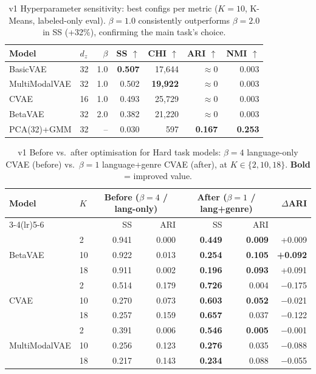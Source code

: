 \documentclass{article}
\begin{document}
\begin{table}[H]
\centering
\caption{v1 Hyperparameter sensitivity: best configs per metric ($K\!=\!10$, K-Means,
labeled-only eval). $\beta\!=\!1.0$ consistently outperforms $\beta\!=\!2.0$ in SS (+32\%),
confirming the main task's choice.}
\label{tab:finetune}
\small
\begin{tabular}{llrrrrr}
\toprule
\textbf{Model} & \textbf{$d_z$} & \textbf{$\beta$} & \textbf{SS $\uparrow$} &
\textbf{CHI $\uparrow$} & \textbf{ARI $\uparrow$} & \textbf{NMI $\uparrow$} \\
\midrule
BasicVAE      & 32 & 1.0 & \textbf{0.507} & 17,644 & $\approx$0 & 0.003 \\
MultiModalVAE & 32 & 1.0 & 0.502 & \textbf{19,922} & $\approx$0 & 0.003 \\
CVAE          & 16 & 1.0 & 0.493 & 25,729 & $\approx$0 & 0.003 \\
BetaVAE       & 32 & 2.0 & 0.382 & 21,220 & $\approx$0 & 0.003 \\
\rowcolor{gray!15} PCA(32)+GMM & 32 & -- & 0.030 & 597 & \textbf{0.167} & \textbf{0.253} \\
\bottomrule
\end{tabular}
\end{table}

\begin{table}[H]
\centering
\caption{v1 Before vs.\ after optimisation for Hard task models: $\beta\!=\!4$ language-only
CVAE (before) vs.\ $\beta\!=\!1$ language+genre CVAE (after), at $K\!\in\!\{2,10,18\}$.
\textbf{Bold} = improved value.}
\label{tab:before_after}
\small
\begin{tabular}{llrrrrr}
\toprule
\textbf{Model} & \textbf{$K$} & \multicolumn{2}{c}{\textbf{Before ($\beta\!=\!4$ / lang-only)}} &
\multicolumn{2}{c}{\textbf{After ($\beta\!=\!1$ / lang+genre)}} & \textbf{$\Delta$ARI} \\
\cmidrule(lr){3-4}\cmidrule(lr){5-6}
 & & SS & ARI & SS & ARI & \\
\midrule
\multirow{3}{*}{BetaVAE}
 & 2  & 0.941 & 0.000 & \textbf{0.449} & \textbf{0.009} & +0.009 \\
 & 10 & 0.922 & 0.013 & \textbf{0.254} & \textbf{0.105} & \textbf{+0.092} \\
 & 18 & 0.911 & 0.002 & \textbf{0.196} & \textbf{0.093} & +0.091 \\
\midrule
\multirow{3}{*}{CVAE}
 & 2  & 0.514 & 0.179 & \textbf{0.726} & 0.004 & $-$0.175 \\
 & 10 & 0.270 & 0.073 & \textbf{0.603} & \textbf{0.052} & $-$0.021 \\
 & 18 & 0.257 & 0.159 & \textbf{0.657} & 0.037 & $-$0.122 \\
\midrule
\multirow{3}{*}{MultiModalVAE}
 & 2  & 0.391 & 0.006 & \textbf{0.546} & \textbf{0.005} & $-$0.001 \\
 & 10 & 0.256 & 0.123 & \textbf{0.276} & 0.035 & $-$0.088 \\
 & 18 & 0.217 & 0.143 & \textbf{0.234} & 0.088 & $-$0.055 \\
\bottomrule
\end{tabular}
\end{table}
\end{document}
